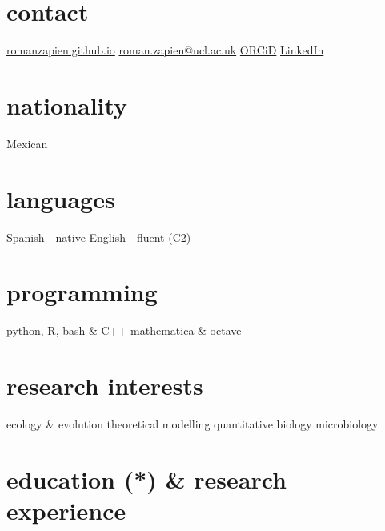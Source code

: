 \documentclass[]{friggeri-cv} %
\begin{document}


\begin{aside} %
\section{contact}
\href{https://romanzapien.github.io}{romanzapien.github.io}
\href{mailto:roman.zapien@ucl.ac.uk}{roman.zapien@ucl.ac.uk}
\href{https://orcid.org/0000-0003-0221-0936}{ORCiD}
\href{https://www.linkedin.com/in/romanzapien-campos/}{LinkedIn}
\section{nationality}
Mexican
\section{languages}
Spanish - native
English - fluent (C2)
\section{programming}
python, R, bash \& C++ 
mathematica \& octave
\section{research interests}
ecology \& evolution
theoretical modelling
quantitative biology
microbiology
\end{aside}


\section{education (*) \& research experience}
\end{document}
